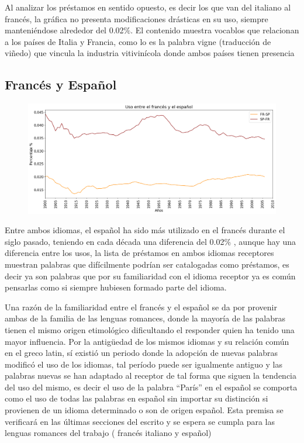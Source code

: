 Al analizar los préstamos en sentido opuesto, es decir los que van del italiano al francés,  la gráfica no presenta modificaciones drásticas en su uso,  siempre manteniéndose alrededor del 0.02$\%$. El contenido muestra vocablos que relacionan a los países de Italia y Francia, como lo es la palabra vigne  (traducción de viñedo) que vincula la industria vitivinícola donde ambos países tienen presencia

\newpage
\subsection{Francés y Español}


\begin{figure}[h!]
	\centering
	\includegraphics[scale=.38]{Cap_3/SF_4_S2_FR.png}
	\label{SF_FS}
	\caption{}
\end{figure}



Entre ambos idiomas, el español ha sido más utilizado en el francés durante el siglo pasado,  teniendo en cada década una diferencia del 0.02$\%$ , aunque hay una diferencia entre los usos, la lista de préstamos en ambos idiomas receptores muestran palabras que difícilmente podrían ser catalogadas como préstamos, es decir ya son palabras que por su familiaridad con el idioma receptor ya es común pensarlas como si siempre hubiesen formado parte del idioma.   

Una razón de la familiaridad entre el francés y el español se da por  provenir ambas de la familia de las lenguas romances, donde la mayoría de las palabras tienen el mismo origen etimológico dificultando el responder quien ha tenido una mayor influencia. Por la antigüedad de los mismos idiomas y su relación común en el greco latin, sí existió un periodo donde la adopción de nuevas palabras modificó el uso de los idiomas, tal período puede ser igualmente antiguo y las palabras nuevas se han adaptado al receptor de tal forma que siguen la tendencia del uso del mismo, es decir el uso de  la palabra “París” en el español se comporta como el uso de todas las palabras en español sin importar su distinción si provienen de un idioma determinado o son de origen español.  Esta premisa se verificará en las últimas secciones del escrito y se espera se cumpla para las lenguas romances del trabajo ( francés italiano y español)



